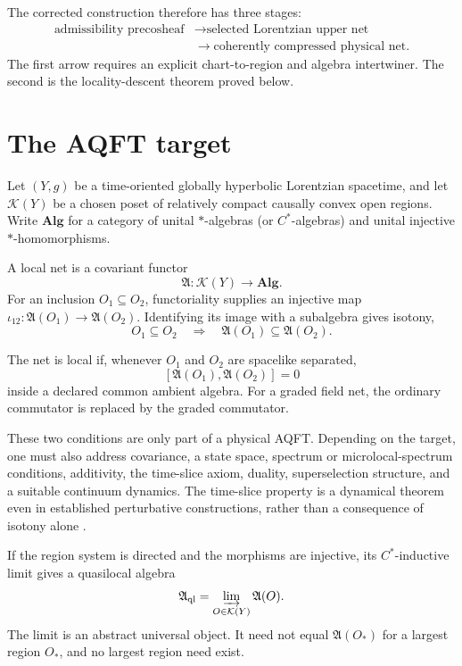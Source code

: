\documentclass[11pt]{article}
\begin{document}
The corrected construction therefore has three stages:
\[
\begin{aligned}
 \text{admissibility precosheaf}
 &\longrightarrow \text{selected Lorentzian upper net}\\
 &\longrightarrow \text{coherently compressed physical net}.
\end{aligned}
\]
The first arrow requires an explicit chart-to-region and algebra
intertwiner.  The second is the locality-descent theorem proved below.

\section{The AQFT target}

Let $(Y,g)$ be a time-oriented globally hyperbolic Lorentzian spacetime, and
let $\mathcal K(Y)$ be a chosen poset of relatively compact causally convex
open regions.  Write $\mathbf{Alg}$ for a category of unital $*$-algebras (or
$C^*$-algebras) and unital injective $*$-homomorphisms.

\begin{definition}
A local net is a covariant functor
\[
 \mathfrak A:\mathcal K(Y)\longrightarrow\mathbf{Alg}.
\]
For an inclusion $O_1\subseteq O_2$, functoriality supplies an injective map
$\iota_{12}:\mathfrak A(O_1)\to\mathfrak A(O_2)$.  Identifying its image with
a subalgebra gives isotony,
\[
 O_1\subseteq O_2
 \quad\Longrightarrow\quad
 \mathfrak A(O_1)\subseteq\mathfrak A(O_2).
\]
\end{definition}

\begin{definition}
The net is local if, whenever $O_1$ and $O_2$ are spacelike separated,
\[
 [\mathfrak A(O_1),\mathfrak A(O_2)]=0
\]
inside a declared common ambient algebra.  For a graded field net, the ordinary
commutator is replaced by the graded commutator.
\end{definition}

These two conditions are only part of a physical AQFT.  Depending on the
target, one must also address covariance, a state space, spectrum or
microlocal-spectrum conditions, additivity, the time-slice axiom, duality,
superselection structure, and a suitable continuum dynamics.  The time-slice
property is a dynamical theorem even in established perturbative
constructions, rather than a consequence of isotony alone
\cite{ChilianFredenhagen2008}.

If the region system is directed and the morphisms are injective, its
$C^*$-inductive limit gives a quasilocal algebra
\[
 \mathfrak A_{\mathrm{ql}}
 =\varinjlim_{O\in\mathcal K(Y)}\mathfrak A(O).
\]
The limit is an abstract universal object.  It need not equal
$\mathfrak A(O_*)$ for a largest region $O_*$, and no largest region need
exist.
\end{document}
